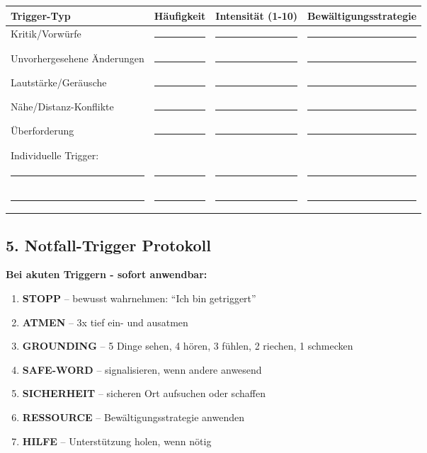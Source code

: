 {\begin{center}
\begin{tabular}{|p{3cm}|p{3cm}|p{3cm}|p{4cm}|}
\hline
\textbf{Trigger-Typ} & \textbf{Häufigkeit} & \textbf{Intensität (1-10)} & \textbf{Bewältigungsstrategie} \\
\hline
Kritik/Vorwürfe & \rule{2cm}{0.4pt} & \rule{2cm}{0.4pt} & \rule{3cm}{0.4pt} \\
\hline
Unvorhergesehene Änderungen & \rule{2cm}{0.4pt} & \rule{2cm}{0.4pt} & \rule{3cm}{0.4pt} \\
\hline
Lautstärke/Geräusche & \rule{2cm}{0.4pt} & \rule{2cm}{0.4pt} & \rule{3cm}{0.4pt} \\
\hline
Nähe/Distanz-Konflikte & \rule{2cm}{0.4pt} & \rule{2cm}{0.4pt} & \rule{3cm}{0.4pt} \\
\hline
Überforderung & \rule{2cm}{0.4pt} & \rule{2cm}{0.4pt} & \rule{3cm}{0.4pt} \\
\hline
Individuelle Trigger: & & & \\
\rule{2.5cm}{0.4pt} & \rule{2cm}{0.4pt} & \rule{2cm}{0.4pt} & \rule{3cm}{0.4pt} \\
\hline
\rule{2.5cm}{0.4pt} & \rule{2cm}{0.4pt} & \rule{2cm}{0.4pt} & \rule{3cm}{0.4pt} \\
\hline
\end{tabular}
\end{center}

\hypertarget{notfall-trigger-protokoll}{%
\subsection{5. Notfall-Trigger Protokoll}}\label{notfall-trigger-protokoll}

\textbf{Bei akuten Triggern - sofort anwendbar:}

\begin{enumerate}
\def\labelenumi{\arabic{enumi}.}
\tightlist
\item
  \textbf{STOPP} -- bewusst wahrnehmen: ``Ich bin getriggert''
\item
  \textbf{ATMEN} -- 3x tief ein- und ausatmen
\item
  \textbf{GROUNDING} -- 5 Dinge sehen, 4 hören, 3 fühlen, 2 riechen, 1 schmecken
\item
  \textbf{SAFE-WORD} -- signalisieren, wenn andere anwesend
\item
  \textbf{SICHERHEIT} -- sicheren Ort aufsuchen oder schaffen
\item
  \textbf{RESSOURCE} -- Bewältigungsstrategie anwenden
\item
  \textbf{HILFE} -- Unterstützung holen, wenn nötig
\end{enumerate}

}
